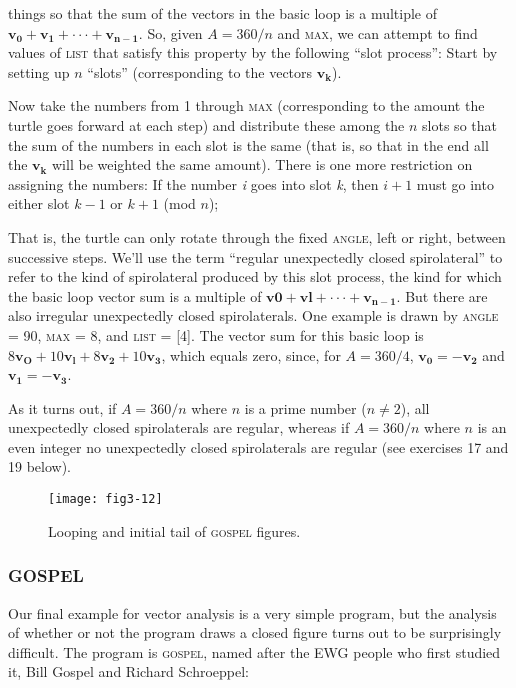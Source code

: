 \documentclass{book}
\begin{document}
things so that the sum of the vectors in the basic loop is a multiple of
$\mathbf{v_0} + \mathbf{v_1} + \cdot \cdot \cdot + \mathbf{v_{n-1}}$. So, given $A = 360/n$ and \textsc{max}, we can attempt
to find values of \textsc{list} that satisfy this property by the following ``slot process'': Start by setting up $n$ ``slots'' (corresponding to the vectors $\mathbf{v_k}$).

Now take the numbers from 1 through \textsc{max} (corresponding to the amount
the turtle goes forward at each step) and distribute these among the $n$
slots so that the sum of the numbers in each slot is the same (that is,
so that in the end all the $\mathbf{v_k}$ will be weighted the same amount). There
is one more restriction on assigning the numbers: If the number {\em i} goes
into slot {\em k}, then $i + 1$ must go into either slot $k - 1$ or $k + 1$ (mod $n$);

That is, the turtle can only rotate through the fixed \textsc{angle}, left or right,
between successive steps. We'll use the term ``regular unexpectedly
closed spirolateral'' to refer to the kind of spirolateral produced by this
slot process, the kind for which the basic loop vector sum is a multiple
of $\mathbf{v0} + \mathbf{vl} + \cdot \cdot \cdot   + \mathbf{v_{n-1}}$. But there are also irregular unexpectedly
closed spirolaterals. One example is drawn by \textsc{angle} = 90, \textsc{max} = 8,
and \textsc{list} = [4]. The vector sum for this basic loop is
$8\mathbf{v_O} + 10\mathbf{v_l} + 8\mathbf{v_2} + 10\mathbf{v_3}$,
which equals zero, since, for $A = 360/4$, $\mathbf{v_0} = -\mathbf{v_2}$ and $\mathbf{v_1} = -\mathbf{v_3}$.

As it turns out, if $A = 360/n$ where $n$ is a prime number ($n \not= 2$), all unexpectedly closed spirolaterals are regular, whereas if $A = 360/n$ where $n$ is an even integer no unexpectedly closed spirolaterals
are regular (see exercises 17 and 19 below).

\begin{figure}
\begin{center}
\texttt{[image: fig3-12]}
\caption{Looping and initial tail of \textsc{gospel} figures.}
\end{center}
\end{figure}

\subsubsection{GOSPEL}

Our final example for vector analysis is a very simple program, but the
analysis of whether or not the program draws a closed figure turns out
to be surprisingly difficult. The program is \textsc{gospel}, named after the EWG
people who first studied it, Bill Gospel and Richard Schroeppel:
\end{document}
